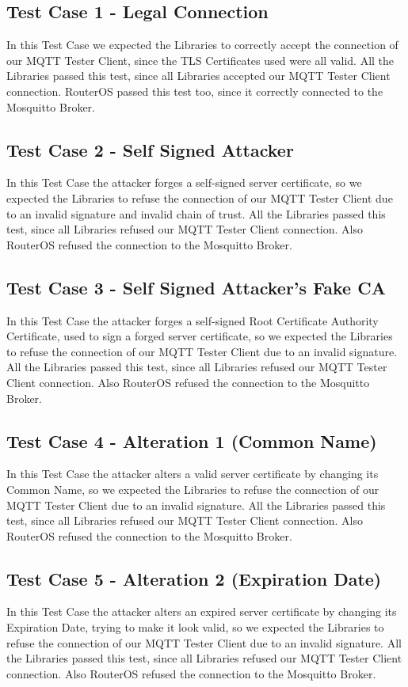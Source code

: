 \documentclass[binding=0.6cm,noexaminfo]{sapthesis}
\begin{document}
\subsection{Test Case 1 - Legal Connection}
In this Test Case we expected the Libraries to correctly accept the connection of our MQTT Tester Client, since the TLS Certificates used were all valid. All the Libraries passed this test, since all Libraries accepted our MQTT Tester Client connection.
RouterOS passed this test too, since it correctly connected to the Mosquitto Broker.

\subsection{Test Case 2 - Self Signed Attacker}
In this Test Case the attacker forges a self-signed server certificate, so we expected the Libraries to refuse the connection of our MQTT Tester Client due to an invalid signature and invalid chain of trust. All the Libraries passed this test, since all Libraries refused our MQTT Tester Client connection.
Also RouterOS refused the connection to the Mosquitto Broker.

\subsection{Test Case 3 - Self Signed Attacker's Fake CA}
In this Test Case the attacker forges a self-signed Root Certificate Authority Certificate, used to sign a forged server certificate, so we expected the Libraries to refuse the connection of our MQTT Tester Client due to an invalid signature. All the Libraries passed this test, since all Libraries refused our MQTT Tester Client connection.
Also RouterOS refused the connection to the Mosquitto Broker.

\subsection{Test Case 4 - Alteration 1 (Common Name)}
In this Test Case the attacker alters a valid server certificate by changing its Common Name, so we expected the Libraries to refuse the connection of our MQTT Tester Client due to an invalid signature. All the Libraries passed this test, since all Libraries refused our MQTT Tester Client connection.
Also RouterOS refused the connection to the Mosquitto Broker.

\subsection{Test Case 5 - Alteration 2 (Expiration Date)}
In this Test Case the attacker alters an expired server certificate by changing its Expiration Date, trying to make it look valid, so we expected the Libraries to refuse the connection of our MQTT Tester Client due to an invalid signature. All the Libraries passed this test, since all Libraries refused our MQTT Tester Client connection.
Also RouterOS refused the connection to the Mosquitto Broker.
\end{document}
